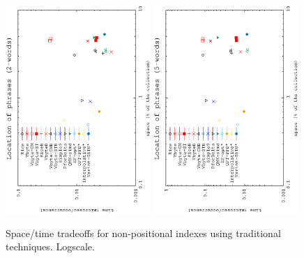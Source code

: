\documentclass[review]{elsarticle}
\begin{document}
\begin{figure}[t]
\begin{center}
\includegraphics[angle=-90,width=0.49\textwidth]{../figures/f1/phrases2-2/nopos-2_2.eps}
\includegraphics[angle=-90,width=0.49\textwidth]{../figures/f1/phrases5-5/nonpos-5_5.eps}
\caption{Space/time tradeoffs for non-positional indexes using traditional
techniques. Logscale.}
\label{fig:nonpos}
\end{center}
\end{figure}
\end{document}
